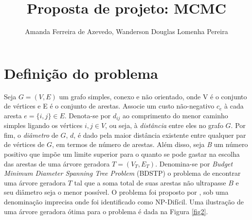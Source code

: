\documentclass[12pt]{article}
\title{Proposta de projeto: MCMC}
\author{Amanda Ferreira de Azevedo\inst{1}, Wanderson Douglas Lomenha Pereira\inst{1}}
\begin{document}
 

\maketitle

%     

\section{Definição do problema}


Seja $G = (V, E)$ um grafo simples, conexo e não orientado, onde V é o conjunto de vértices e E é o conjunto de arestas. Associe um custo não-negativo $c_e$ à cada aresta $e = \{i,j\} \in E$. Denota-se por $d_{ij}$ ao comprimento do menor caminho simples ligando os vértices $i,j \in V$, ou seja, à \textit{distância} entre eles no grafo $G$. Por fim, o \textit{diâmetro} de $G$, $d$, é dado pela maior distância existente entre qualquer par de vértices de $G$, em termos de número de arestas. Além disso, seja \textit{B} um número positivo que impõe um limite superior para o quanto se pode gastar na escolha das arestas de uma árvore geradora $T = (V_T, E_T)$. Denomina-se por \textit{Budget Minimum Diameter Spanning Tree Problem} (BDSTP) o problema de encontrar uma árvore geradora $T$ tal que a soma total de suas arestas não ultrapasse $B$ e seu diâmetro seja o menor possível. O problema foi proposto por \cite{Plesnik1981}, sob uma denominação imprecisa onde foi identificado como NP-Difícil. Uma ilustração de uma árvore geradora ótima para o problema é dada na Figura \ref{fig2}. 
\end{document}
